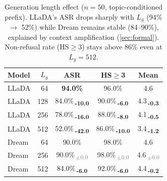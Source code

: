 \documentclass{article}
\newcommand{\ddn}[1]{\,\textsubscript{\textcolor{deltadn}{\textbf{-#1}}}}
\newcommand{\dz}[0]{\,\textsubscript{\textcolor{gray}{$\pm$0.0}}}
\theoremstyle{coloredthm}
\begin{document}
\begin{table}[htbp]
\centering
\small
\setlength{\tabcolsep}{4pt}
\renewcommand{\arraystretch}{1.1}
\begin{tabular}{@{}lrccc@{}}
\toprule
\textbf{Model} & $L_g$ & \textbf{ASR} & \textbf{HS$\geq$3} & \textbf{Mean} \\
\midrule
\rowcolor{cellbase} LLaDA & 64 & \textbf{94.0\%} & 96.0\% & 4.6 \\
\rowcolor{cellblue} LLaDA & 128 & 84.0\%\ddn{10.0} & 90.0\%\ddn{6.0} & 4.3\ddn{0.3} \\
\rowcolor{cellblue} LLaDA & 256 & 78.0\%\ddn{16.0} & 88.0\%\ddn{8.0} & 4.1\ddn{0.5} \\
\rowcolor{cellpink} LLaDA & 512 & 52.0\%\ddn{42.0} & 86.0\%\ddn{10.0} & 3.4\ddn{1.2} \\
\midrule
\rowcolor{celltealg} Dream & 64 & 90.0\% & 98.0\% & 4.6 \\
\rowcolor{celltealg} Dream & 256 & 90.0\%\dz & 98.0\%\dz & 4.6\dz \\
\rowcolor{celltealg} Dream & 512 & 84.0\%\ddn{6.0} & 92.0\%\ddn{6.0} & 4.4\ddn{0.2} \\
\bottomrule
\end{tabular}
\caption{Generation length effect ($n{=}50$, topic-conditioned prefix). LLaDA's ASR drops sharply with $L_g$ (94\% $\to$ 52\%) while Dream remains stable (84--90\%), explained by context amplification (\cref{sec:formal}). Non-refusal rate (HS$\geq$3) stays above 86\% even at $L_g{=}512$.}
\label{tab:gen_length}
\end{table}
\end{document}
